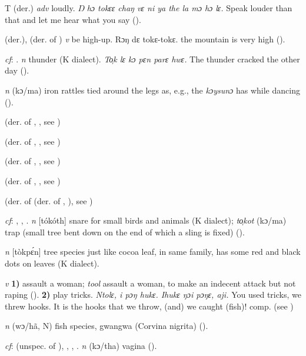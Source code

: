 \begin{letter}{T}
 (der.) \textit{adv} loudly. \textit{Ŋ hɔ tokɛɛ chaŋ vɛ ni ya the la mɔ hɔ lɛ.} Speak louder than that and let me hear what you say (\citealt{Pichl1967}). 

 (der.), (der. of ) \textit{v} be high-up. Rɔŋ dɛ tokɛ-tokɛ. the mountain is very high (\citealt{Pichl1967}). 

 \textit{cf}: . \textit{n} thunder (K dialect). \textit{To̹k lɛ kɔ pɛn parɛ hwɛ.} The thunder cracked the other day (\citealt{Pichl1967}). 

 \textit{n} (kɔ/ma) iron rattles tied around the legs as, e.g., the \textit{kɔysunɔ} has while dancing (\citealt{Pichl1967}). 

 (der. of , , see ) 

 (der. of , , see )

 (der. of , , see ) 

 (der. of , , see ) 

 (der. of  (der. of , ), see ) 

 \textit{cf}: , , . \textit{n} [tókóth] snare for small birds and animals (K dialect); \textit{to̹kot} (kɔ/ma) trap (small tree bent down on the end of which a sling is fixed) (\citealt{Pichl1967}). 

 \textit{n} [tòkpɛ́n] tree species just like cocoa leaf, in same family, has some red and black dots on leaves (K dialect). 

 \textit{v} \textbf{1)} assault a woman; \textit{tool} assault a woman, to make an indecent attack but not raping (\citealt{Pichl1967}). \textbf{2)} play tricks. \textit{Ntolɛ, i pɔŋ hukɛ. Ihukɛ ŋɔi pɔŋɛ, aji.} You used tricks, we threw hooks. It is the hooks that we throw, (and) we caught (fish)! comp.  (see ) 

 \textit{n} (wɔ/hã, N) fish species, gwangwa (Corvina nigrita) (\citealt{Pichl1967}). 

 \textit{cf}:  (unspec. of ), , , . \textit{n} (kɔ/tha) vagina (\citealt{Pichl1967}). 


\end{letter}
